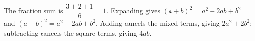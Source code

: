 The fraction sum is $\dfrac{3+2+1}{6}=1$. Expanding gives $(a+b)^2=a^2+2ab+b^2$ and $(a-b)^2=a^2-2ab+b^2$. Adding cancels the mixed terms, giving $2a^2+2b^2$; subtracting cancels the square terms, giving $4ab$.

